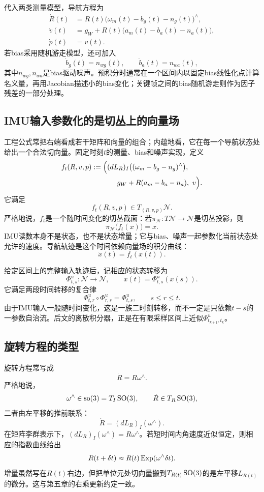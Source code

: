 代入两类测量模型，导航方程为
\[
\boxed{
\begin{aligned}
    \dot R(t)
    &=R(t)\bigl(\omega_m(t)-b_g(t)-n_g(t)\bigr)^\wedge,\\
    \dot v(t)
    &=g_W+R(t)\bigl(a_m(t)-b_a(t)-n_a(t)\bigr),\\
    \dot p(t)
    &=v(t).
\end{aligned}
}
\]
若bias采用随机游走模型，还可加入
\[
    \dot b_g(t)=n_{wg}(t),
    \qquad
    \dot b_a(t)=n_{wa}(t),
\]
其中$n_{wg},n_{wa}$是bias驱动噪声。预积分时通常在一个区间内以固定bias线性化点计算名义量，再用Jacobian描述小的bias变化；关键帧之间的bias随机游走则作为因子残差的一部分处理。

\subsection{IMU输入参数化的是切丛上的向量场}

工程公式常把右端看成若干矩阵和向量的组合；内蕴地看，它在每一个导航状态处给出一个合法切向量。固定时刻$t$的测量、bias和噪声实现，定义
\[
\begin{aligned}
    f_t(R,v,p)
    :={}&\Bigl(
      (dL_R)_I\bigl((\omega_m-b_g-n_g)^\wedge\bigr),\\
      &\qquad g_W+R(a_m-b_a-n_a),
      \ v
    \Bigr).
\end{aligned}
\]
它满足
\[
    f_t(R,v,p)\in T_{(R,v,p)}\mathcal N.
\]
严格地说，$f_t$是一个随时间变化的切丛截面：若$\pi_{\mathcal N}:T\mathcal N\to\mathcal N$是切丛投影，则
\[
    \pi_{\mathcal N}\bigl(f_t(x)\bigr)=x.
\]
IMU读数本身不是状态，也不是状态增量；它与bias、噪声一起参数化当前状态处允许的速度。导航轨迹是这个时间依赖向量场的积分曲线：
\[
    \dot x(t)=f_t(x(t)).
\]

给定区间上的完整输入轨迹后，记相应的状态转移为
\[
    \Phi^u_{t,s}:\mathcal N\to\mathcal N,
    \qquad
    x(t)=\Phi^u_{t,s}(x(s)).
\]
它满足两段时间转移的复合律
\[
    \Phi^u_{t,r}\circ\Phi^u_{r,s}
    =\Phi^u_{t,s},
    \qquad s\le r\le t.
\]
由于IMU输入一般随时间变化，这是一族二时刻转移，而不一定是只依赖$t-s$的一参数自治流。后文的离散积分器，正是在有限采样区间上近似$\Phi^u_{t_{k+1},t_k}$。

\subsection{旋转方程的类型}

旋转方程常写成
\[
    \dot R=R\omega^\wedge.
\]
严格地说，
\[
    \omega^\wedge\in\operatorname{so}(3)=T_I\operatorname{SO}(3),
    \qquad
    \dot R\in T_R\operatorname{SO}(3),
\]
二者由左平移的推前联系：
\[
    \dot R=(dL_R)_I(\omega^\wedge).
\]
在矩阵李群表示下，$(dL_R)_I(\omega^\wedge)=R\omega^\wedge$。若短时间内角速度近似恒定，则相应的指数曲线给出
\[
    R(t+\delta t)
    \approx
    R(t)\operatorname{Exp}(\omega^\wedge\delta t).
\]
增量虽然写在$R(t)$右边，但把单位元处切向量搬到$T_{R(t)}\operatorname{SO}(3)$的是左平移$L_{R(t)}$的微分。这与第五章的右乘更新约定一致。


